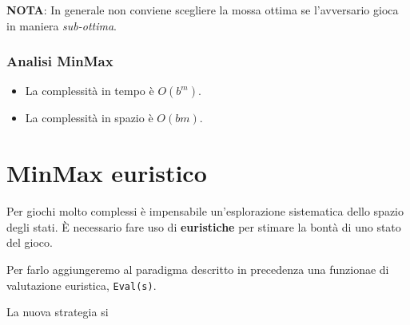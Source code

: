\textbf{NOTA}: In generale non conviene scegliere la mossa ottima se l'avversario gioca in maniera \emph{sub-ottima}.

\subsubsection{Analisi MinMax}
\begin{itemize}
	\item La complessit\`a in tempo \`e $O(b^m)$.
	\item La complessit\`a in spazio \`e $O(bm)$.
\end{itemize}

\section{MinMax euristico}
Per giochi molto complessi \`e impensabile un'esplorazione sistematica dello spazio degli stati. \`E necessario fare
uso di \textbf{euristiche} per stimare la bont\`a di uno stato del gioco.

Per farlo aggiungeremo al paradigma descritto in precedenza una funzionae di valutazione euristica, \verb|Eval(s)|.

La nuova strategia si